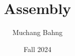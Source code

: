\documentclass{article}
\begin{document}
\title{Assembly}
\author{Muchang Bahng}
\date{Fall 2024}

\maketitle
\tableofcontents
\pagebreak











\end{document}
